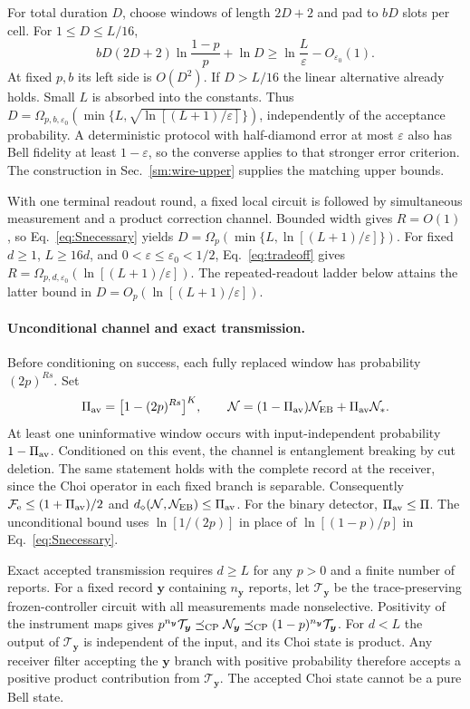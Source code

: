 \documentclass[aps,prl,twocolumn,superscriptaddress,longbibliography,reprint,floatfix]{revtex4-2}
\newcommand{\eps}{\varepsilon}
\newcommand{\Fe}{\mathcal F_{\mathrm e}}
\newcommand{\EB}{\mathrm{EB}}
\newcommand{\channel}{\mathcal N}
\begin{document}
For total duration $D$, choose windows of length $2D+2$ and pad to $bD$
slots per cell. For $1\le D\le L/16$,
\begin{equation}
 bD(2D+2)\ln\frac{1-p}{p}+\ln D
 \ge\ln\frac L\eps-O_{\eps_0}(1).
 \label{eq:Sduration}
\end{equation}
At fixed $p,b$ its left side is $O(D^2)$. If $D>L/16$ the linear
alternative already holds. Small $L$ is absorbed into the constants.
Thus
$D=\Omega_{p,b,\eps_0}(\min\{L,\sqrt{\ln[(L+1)/\eps]}\})$,
independently of the acceptance probability. A deterministic protocol with
half-diamond error at most $\eps$ also has Bell fidelity at least
$1-\eps$, so the converse applies to that stronger error criterion.
The construction in Sec.~\ref{sm:wire-upper} supplies the matching
upper bounds.

With one terminal readout round, a fixed local circuit is followed by
simultaneous measurement and a product correction channel. Bounded width
gives $R=O(1)$, so Eq.~\eqref{eq:Snecessary} yields
$D=\Omega_p(\min\{L,\ln[(L+1)/\eps]\})$.
For fixed $d\ge1$, $L\ge16d$, and $0<\eps\le\eps_0<1/2$,
Eq.~\eqref{eq:tradeoff} gives
$R=\Omega_{p,d,\eps_0}(\ln[(L+1)/\eps])$.
The repeated-readout ladder below attains the latter bound in
$D=O_p(\ln[(L+1)/\eps])$.

\paragraph*{Unconditional channel and exact transmission.}
Before conditioning on success, each fully replaced window has
probability $(2p)^{Rs}$. Set
\begin{equation}
 \Pi_{\rm av}=\bigl[1-(2p)^{Rs}\bigr]^K,\qquad
 \channel=(1-\Pi_{\rm av})\channel_{\EB}+\Pi_{\rm av}\channel_* .
 \label{eq:unconditional}
\end{equation}
At least one uninformative window occurs with input-independent
probability $1-\Pi_{\rm av}$. Conditioned on this event, the channel is
entanglement breaking by cut deletion. The same statement holds with the complete
record at the receiver, since the Choi operator in each fixed branch is
separable. Consequently
$\Fe\le(1+\Pi_{\rm av})/2$ and
$d_\diamond(\channel,\channel_{\EB})\le \Pi_{\rm av}$.
For the binary detector, $\Pi_{\rm av}\le\Pi$.
The unconditional bound uses $\ln[1/(2p)]$ in place of
$\ln[(1-p)/p]$ in Eq.~\eqref{eq:Snecessary}.

Exact accepted transmission requires $d\ge L$ for any $p>0$ and a finite
number of reports. For a fixed record $\boldsymbol y$ containing $n_{\boldsymbol y}$ reports,
let $\mathcal T_{\boldsymbol y}$ be the trace-preserving frozen-controller circuit with
all measurements made nonselective. Positivity of the instrument maps gives
$p^{n_{\boldsymbol y}}\mathcal T_{\boldsymbol y}\preceq_{\rm CP}\channel_{\boldsymbol y}
\preceq_{\rm CP}(1-p)^{n_{\boldsymbol y}}\mathcal T_{\boldsymbol y}$.
For $d<L$ the output of $\mathcal T_{\boldsymbol y}$ is independent of the input,
and its Choi state is product.
Any receiver filter accepting the $\boldsymbol y$ branch with positive probability
therefore accepts a positive product contribution from $\mathcal T_{\boldsymbol y}$.
The accepted Choi state cannot be a pure Bell state.
\end{document}

